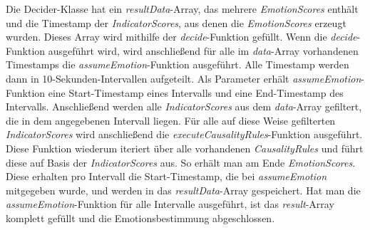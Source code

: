 Die Decider-Klasse hat ein \textit{resultData}-Array, das mehrere \textit{EmotionScores} enthält und die Timestamp der \textit{IndicatorScores}, aus denen die \textit{EmotionScores} erzeugt wurden. Dieses Array wird mithilfe der \textit{decide}-Funktion gefüllt. Wenn die \textit{decide}-Funktion ausgeführt wird, wird anschließend für alle im \textit{data}-Array vorhandenen Timestamps die \textit{assumeEmotion}-Funktion ausgeführt. Alle Timestamp werden dann in 10-Sekunden-Intervallen aufgeteilt. Als Parameter erhält \textit{assumeEmotion}-Funktion eine Start-Timestamp eines Intervalls und eine End-Timestamp des Intervalls. Anschließend werden alle \textit{IndicatorScores} aus dem \textit{data}-Array gefiltert, die in dem angegebenen Intervall liegen. Für alle auf diese Weise gefilterten \textit{IndicatorScores} wird anschließend die \textit{executeCausalityRules}-Funktion ausgeführt. Diese Funktion wiederum iteriert über alle vorhandenen \textit{CausalityRules} und führt diese auf Basis der \textit{IndicatorScores} aus. So erhält man am Ende \textit{EmotionScores}. Diese erhalten pro Intervall die Start-Timestamp, die bei \textit{assumeEmotion} mitgegeben wurde, und werden in das \textit{resultData}-Array gespeichert. Hat man die \textit{assumeEmotion}-Funktion für alle Intervalle ausgeführt, ist das \textit{result}-Array komplett gefüllt und die Emotionsbestimmung abgeschlossen.
